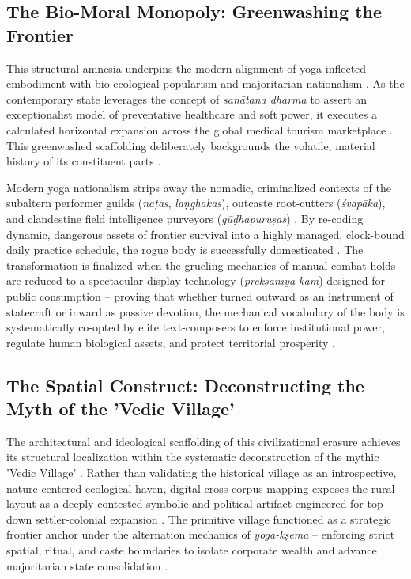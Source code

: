\documentclass[11pt,twoside,letterpaper]{article}
\begin{document}
\subsection{The Bio-Moral Monopoly: Greenwashing the Frontier}
This structural amnesia underpins the modern alignment of yoga-inflected embodiment with bio-ecological popularism and majoritarian nationalism \citep{McCartney2021}. As the contemporary state leverages the concept of \textit{sanātana dharma} to assert an exceptionalist model of preventative healthcare and soft power, it executes a calculated horizontal expansion across the global medical tourism marketplace \citep{McCartney2021}. This greenwashed scaffolding deliberately backgrounds the volatile, material history of its constituent parts \citep{McCartney2021}.

Modern yoga nationalism strips away the nomadic, criminalized contexts of the subaltern performer guilds (\textit{naṭas}, \textit{laṇghakas}), outcaste root-cutters (\textit{śvapāka}), and clandestine field intelligence purveyors (\textit{gūḍhapuruṣas}) \citep{McCartney2021}. By re-coding dynamic, dangerous assets of frontier survival into a highly managed, clock-bound daily practice schedule, the rogue body is successfully domesticated \citep{McCartney2021}. The transformation is finalized when the grueling mechanics of manual combat holds are reduced to a spectacular display technology (\textit{prekṣaṇīya kām}) designed for public consumption – proving that whether turned outward as an instrument of statecraft or inward as passive devotion, the mechanical vocabulary of the body is systematically co-opted by elite text-composers to enforce institutional power, regulate human biological assets, and protect territorial prosperity \citep{McCartney2021}.

\subsection{The Spatial Construct: Deconstructing the Myth of the 'Vedic Village'}
The architectural and ideological scaffolding of this civilizational erasure achieves its structural localization within the systematic deconstruction of the mythic 'Vedic Village' \citep{McCartney2026}. Rather than validating the historical village as an introspective, nature-centered ecological haven, digital cross-corpus mapping exposes the rural layout as a deeply contested symbolic and political artifact engineered for top-down settler-colonial expansion \citep{McCartney2026}. The primitive village functioned as a strategic frontier anchor under the alternation mechanics of \textit{yoga-kṣema} – enforcing strict spatial, ritual, and caste boundaries to isolate corporate wealth and advance majoritarian state consolidation \citep{McCartney2026}.
\end{document}
